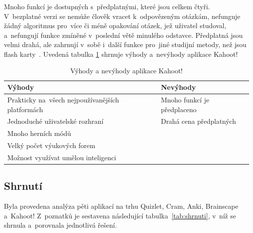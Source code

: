 \documentclass[twoside]{ctuthesis}
\begin{document}
\newpage

Mnoho funkcí je dostupných s~předplatnými, které jsou celkem čtyři. V~bezplatné verzi se nemůže člověk vracet k~odpovězeným otázkám, nefunguje žádný algoritmus pro~více či méně opakování otázek, jež uživatel studoval, a~nefungují funkce zmíněné v~poslední větě minulého odstavce. Předplatná jsou velmi drahá, ale zahrnují v~sobě i~další funkce pro~jiné studijní metody, než jsou flash karty~\cite{kahoot, kahoot-plan}. Uvedená tabulka \ref{tab:kah} shrnuje výhody a~nevýhody aplikace Kahoot!

\begin{table}[H]
\caption{Výhody a nevýhody aplikace Kahoot!}
\begin{tabular}{| >{\centering\arraybackslash}m{5cm} | >{\centering\arraybackslash}m{5cm} |}
\hline
\textbf{Výhody} & \textbf{Nevýhody} \\ \hline
Prakticky na~všech nejpoužívanějších platformách & Mnoho funkcí je předplaceno \\ \hline
Jednoduché uživatelské rozhraní & Drahá cena předplatných \\ \hline
Mnoho herních módů & \\ \hline
Velký počet výukových forem  & \\ \hline
Možnost využívat umělou inteligenci  & \\ \hline
\end{tabular}
\label{tab:kah}
\end{table}

\newpage

\subsection{Shrnutí}

Byla provedena analýza pěti aplikací na trhu Quizlet, Cram, Anki, Brainscape a~Kahoot! Z~poznatků je sestavena následující tabulka~\ref{tab:shrnuti}, v~níž se shrnula a~porovnala jednotlivá řešení.
\end{document}
